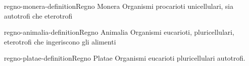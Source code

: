 \documentclass[preview]{standalone}
\begin{document}
\begin{snippetdefinition}{regno-monera-definition}{Regno Monera}
    Organismi procarioti
    unicellulari, sia autotrofi che eterotrofi
\end{snippetdefinition}

\begin{snippetdefinition}{regno-animalia-definition}{Regno Animalia}
    Organismi eucarioti, pluricellulari, eterotrofi
    che ingeriscono gli alimenti
\end{snippetdefinition}

\begin{snippetdefinition}{regno-platae-definition}{Regno Platae}
    Organismi eucarioti pluricellulari autotrofi.
\end{snippetdefinition}
\end{document}
